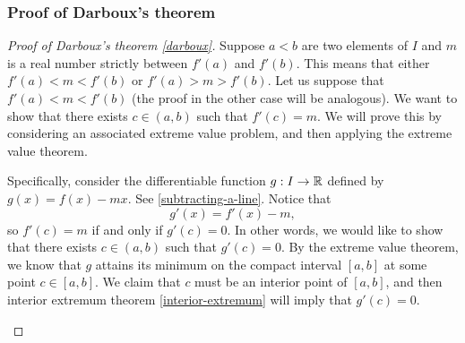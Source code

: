 \subsubsection*{Proof of Darboux's theorem}

\begin{proof}[Proof of Darboux's theorem \ref{darboux}]
	Suppose $a < b$ are two elements of $I$ and $m$ is a real number strictly between $f'(a)$ and $f'(b)$. This means that either $f'(a) < m < f'(b)$ or $f'(a) > m > f'(b)$. Let us suppose that $f'(a) < m < f'(b)$ (the proof in the other case will be analogous). We want to show that there exists $c \in (a,b)$ such that $f'(c) = m$. We will prove this by considering an associated extreme value problem, and then applying the extreme value theorem. 
	
	Specifically, consider the differentiable function $g : I \to \mathbb{R}$ defined by $g(x) = f(x) - mx$. See \cref{subtracting-a-line}. 
	Notice that \[ g'(x) = f'(x) - m, \] so $f'(c) = m$ if and only if $g'(c) = 0$. In other words, we would like to show that there exists $c \in (a, b)$ such that $g'(c) = 0$. By the extreme value theorem, we know that $g$ attains its minimum on the compact interval $[a,b]$ at some point $c \in [a,b]$. We claim that $c$ must be an interior point of $[a,b]$, and then interior extremum theorem \ref{interior-extremum} will imply that $g'(c) = 0$. 
	
	\begin{figure}[ht]
		\begin{center}
\end{center}
\end{figure}
\end{proof}
